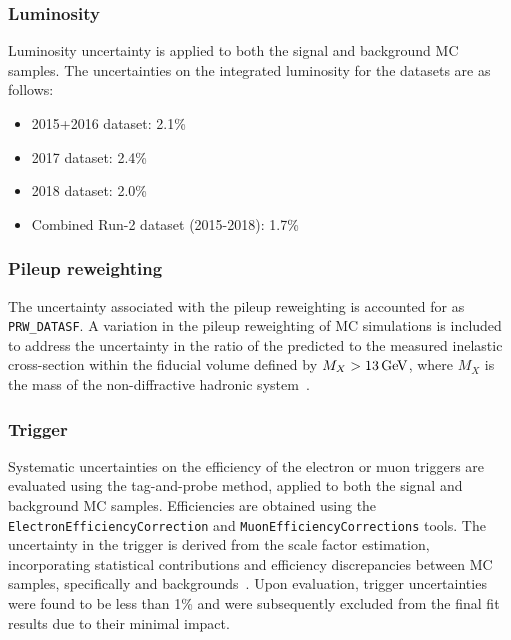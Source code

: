 \clearpage
\subsubsection*{Luminosity}
Luminosity uncertainty is applied to both the signal and background MC samples.
The uncertainties on the integrated luminosity for the datasets are as follows:
\begin{itemize}
    \item 2015+2016 dataset: 2.1\%
    \item 2017 dataset: 2.4\%
    \item 2018 dataset: 2.0\%
    \item Combined Run-2 dataset (2015-2018): 1.7\%
\end{itemize}


\subsubsection*{Pileup reweighting}
The uncertainty associated with the pileup reweighting is accounted for as \texttt{PRW\_DATASF}.
A variation in the pileup reweighting of MC simulations is included to address the uncertainty in the ratio of the predicted to the measured inelastic cross-section within the fiducial volume defined by $M_X > 13\,\text{Ge\kern -0.1em V}$, where $M_X$ is the mass of the non-diffractive hadronic system~\cite{STDM-2015-05}.


\subsubsection*{Trigger}
Systematic uncertainties on the efficiency of the electron or muon triggers are evaluated using the tag-and-probe method, applied to both the signal and background MC samples. Efficiencies are obtained using the \texttt{ElectronEfficiencyCorrection} and \texttt{MuonEfficiencyCorrections} tools.
The uncertainty in the \met trigger is derived from the scale factor estimation, incorporating statistical contributions and efficiency discrepancies between MC samples, specifically \ttbar and \Wjets backgrounds~\cite{Masubuchi:2151844}. Upon evaluation, trigger uncertainties were found to be less than 1\% and were subsequently excluded from the final fit results due to their minimal impact.

